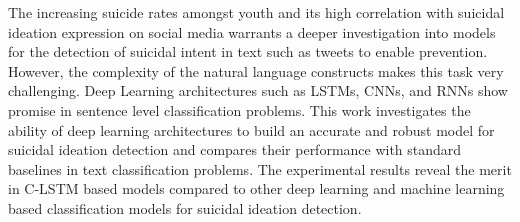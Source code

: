 The increasing suicide rates amongst youth and its high correlation with suicidal ideation expression on social media warrants a deeper investigation into models for the detection of suicidal intent in text such as tweets to enable prevention. However, the complexity of the natural language constructs makes this task very challenging. Deep Learning architectures such as LSTMs, CNNs, and RNNs show promise in sentence level classification problems. This work investigates the ability of deep learning architectures to build an accurate and robust model for suicidal ideation detection and compares their performance with standard baselines in text classification problems. The experimental results reveal the merit in C-LSTM based models compared to other deep learning and machine learning based classification models for suicidal ideation detection.
